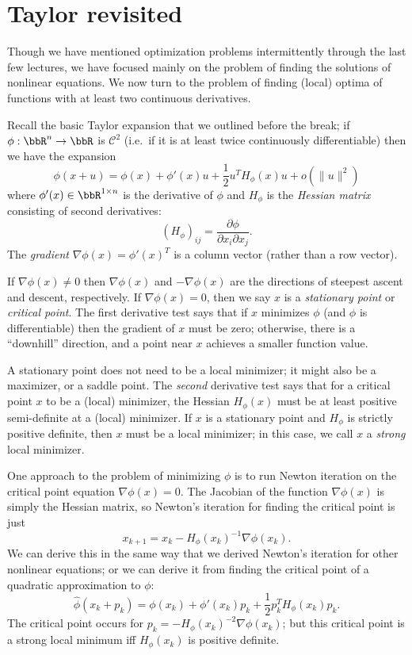 \documentclass[12pt, leqno]{article} %
\begin{document}

\section{Taylor revisited}

Though we have mentioned optimization problems intermittently through
the last few lectures, we have focused mainly on the problem of
finding the solutions of nonlinear equations.  We now turn to the
problem of finding (local) optima of functions with at least two
continuous derivatives.

Recall the basic Taylor expansion that we outlined before the break;
if $\phi : \bbR^n \rightarrow \bbR$ is $\mathcal{C}^2$ (i.e.~if it is
at least twice continuously differentiable) then we have the expansion
\[
  \phi(x+u) = \phi(x) + \phi'(x) u + \frac{1}{2} u^T H_{\phi}(x) u + o(\|u\|^2)
\]
where $\phi'(x) \in \bbR^{1 \times n}$ is the derivative of $\phi$ and
$H_{\phi}$ is the {\em Hessian matrix} consisting of second
derivatives:
\[
  (H_\phi)_{ij} = \frac{\partial \phi}{\partial x_i \partial x_j}.
\]
The {\em gradient} $\nabla \phi(x) = \phi'(x)^T$ is a column vector
(rather than a row vector).

If $\nabla \phi(x) \neq 0$ then $\nabla \phi(x)$ and $-\nabla \phi(x)$
are the directions of steepest ascent and descent, respectively.
If $\nabla \phi(x) = 0$, then we say $x$ is a {\em stationary point}
or {\em critical point}.  The first derivative test says that if $x$
minimizes $\phi$ (and $\phi$ is differentiable) then the gradient of
$x$ must be zero; otherwise, there is a ``downhill'' direction, and
a point near $x$ achieves a smaller function value.

A stationary point does not need to be a local minimizer; it might
also be a maximizer, or a saddle point.  The {\em second} derivative
test says that for a critical point $x$ to be a (local) minimizer, the
Hessian $H_{\phi}(x)$ must be at least positive semi-definite at a
(local) minimizer.  If $x$ is a stationary point and $H_{\phi}$ is
strictly positive definite, then $x$ must be a local minimizer; in
this case, we call $x$ a {\em strong} local minimizer.

One approach to the problem of minimizing $\phi$ is to run Newton
iteration on the critical point equation $\nabla \phi(x) = 0$.
The Jacobian of the function $\nabla \phi(x)$ is simply the Hessian
matrix, so Newton's iteration for finding the critical point is just
\[
  x_{k+1} = x_k - H_{\phi}(x_k)^{-1} \nabla \phi(x_k).
\]
We can derive this in the same way that we derived Newton's iteration
for other nonlinear equations; or we can derive it from finding the
critical point of a quadratic approximation to $\phi$:
\[
  \hat{\phi}(x_k+p_k) =
    \phi(x_k) + \phi'(x_k) p_k + \frac{1}{2} p_k^T H_{\phi}(x_k) p_k.
\]
The critical point occurs for $p_k = -H_{\phi}(x_k)^{-2} \nabla \phi(x_k)$;
but this critical point is a strong local minimum iff $H_{\phi}(x_k)$
is positive definite.
\end{document}
